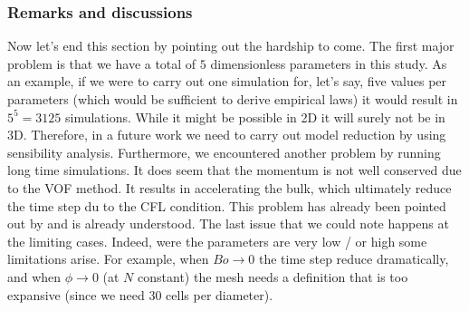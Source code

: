 \subsubsection{Remarks and discussions}
Now let's end this section by pointing out the hardship to come. 
The first major problem is that we have a total of $5$ dimensionless parameters in this study. 
As an example, if we were to carry out one simulation for, let's say, five values per parameters (which would be sufficient to derive empirical laws) it would result in $5^5 = 3125$ simulations. 
While it might be possible in 2D it will surely not be in 3D.
Therefore, in a future work we need to carry out model reduction by using sensibility analysis. 
Furthermore, we encountered another problem by running long time simulations. 
It does seem that the momentum is not well conserved due to the VOF method.
It results in accelerating the bulk, which ultimately reduce the time step du to the CFL condition. 
This problem has already been pointed out by \citet{Naanouh2021numerical} and is already understood. 
The last issue that we could note happens at the limiting cases. 
Indeed, were the parameters are very low / or high some limitations arise. 
For example, when $Bo \rightarrow 0$ the time step reduce dramatically, and when $\phi \rightarrow 0$ (at $N$ constant) the mesh needs a definition that is too expansive (since we need 30 cells per diameter). 